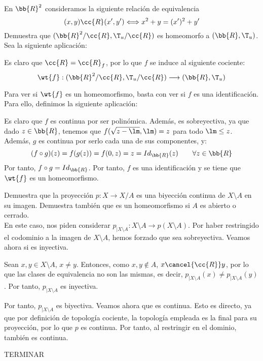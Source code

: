 \begin{ejercicio}
    En $\bb{R}^2$ consideramos la siguiente relación de equivalencia
    \begin{equation*}
        (x, y)\cc{R}(x', y') \Longleftrightarrow x^2 + y = (x')^2 + y'
    \end{equation*}
    Demuestra que $(\bb{R}^2/\cc{R}, \T_u/\cc{R})$ es homeomorfo a $(\bb{R}, \T_u)$.\\

    Sea la siguiente aplicación:

    Es claro que $\cc{R}=\cc{R}_f$, por lo que $f$ se induce al siguiente cociente:
    \begin{equation*}
        \wt{f}:(\bb{R}^2/\cc{R}, \T_u/\cc{R})\longrightarrow (\bb{R}, \T_u)
    \end{equation*}

    Para ver si $\wt{f}$ es un homeomorfismo, basta con ver si $f$ es una identificación. Para ello, definimos la siguiente aplicación:

    Es claro que $f$ es continua por ser polinómica. Además, es sobreyectiva, ya que dado $z\in \bb{R}$, tenemos que $f(\sqrt{z-\lm}, \lm)=z$ para todo $\lm \leq z$. Además, $g$ es continua por serlo cada una de sus componentes, y:
    \begin{equation*}
        (f\circ g)(z) = f(g(z)) = f(0,z) = z = {Id}_{\bb{R}}(z) \qquad \forall z\in \bb{R}
    \end{equation*}
    Por tanto, $f\circ g = {Id}_{\bb{R}}$. Por tanto, $f$ es una identificación y se tiene que $\wt{f}$ es un homeomorfismo.
\end{ejercicio}

\begin{ejercicio}
    Demuestra que la proyección $p : X \to X/A$ es una biyección continua de $X \setminus A$ en su imagen. Demuestra también que es un homeomorfismo si $A$ es abierto o cerrado.\\

    En este caso, nos piden considerar $p_{\big| X\setminus A}:X\setminus A \to p(X\setminus A)$. Por haber restringido el codominio a la imagen de $X\setminus A$, hemos forzado que sea sobreyectiva. Veamos ahora si es inyectiva.
    
    Sean $x,y\in X\setminus A$, $x\neq y$. Entonces, como $x,y\notin A$, $x\cancel{\cc{R}}y$, por lo que las clases de equivalencia no son las mismas, es decir, $p_{\big| X\setminus A}(x)\neq p_{\big| X\setminus A}(y)$. Por tanto, $p_{\big| X\setminus A}$ es inyectiva.

    Por tanto, $p_{\big| X\setminus A}$ es biyectiva. Veamos ahora que es continua. Esto es directo, ya que por definición de topología cociente, la topología empleada es la final para su proyección, por lo que $p$ es continua. Por tanto, al restringir en el dominio, también es continua.


    TERMINAR
\end{ejercicio}

